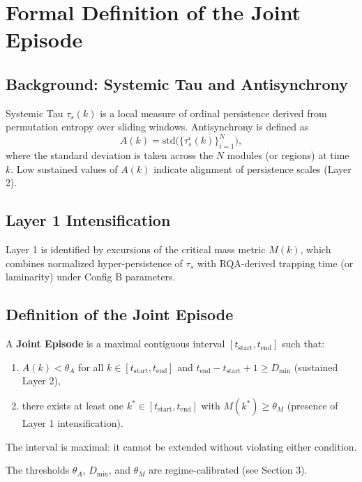 \section{Formal Definition of the Joint Episode}

\subsection{Background: Systemic Tau and Antisynchrony}

Systemic Tau $\tau_s(k)$ is a local measure of ordinal persistence derived from permutation entropy over sliding windows. Antisynchrony is defined as
\[
A(k) = \mathrm{std}\bigl(\{\tau_s^i(k)\}_{i=1}^N\bigr),
\]
where the standard deviation is taken across the $N$ modules (or regions) at time $k$. Low sustained values of $A(k)$ indicate alignment of persistence scales (Layer 2).

\subsection{Layer 1 Intensification}

Layer 1 is identified by excursions of the critical mass metric $M(k)$, which combines normalized hyper-persistence of $\tau_s$ with RQA-derived trapping time (or laminarity) under Config B parameters.

\subsection{Definition of the Joint Episode}

\begin{conceptbox}
A \textbf{Joint Episode} is a maximal contiguous interval $[t_\mathrm{start}, t_\mathrm{end}]$ such that:
\begin{enumerate}
    \item $A(k) < \theta_A$ for all $k \in [t_\mathrm{start}, t_\mathrm{end}]$ and $t_\mathrm{end} - t_\mathrm{start} + 1 \ge D_{\min}$ (sustained Layer 2),
    \item there exists at least one $k^* \in [t_\mathrm{start}, t_\mathrm{end}]$ with $M(k^*) \ge \theta_M$ (presence of Layer 1 intensification).
\end{enumerate}
The interval is maximal: it cannot be extended without violating either condition.
\end{conceptbox}

The thresholds $\theta_A$, $D_{\min}$, and $\theta_M$ are regime-calibrated (see Section 3).


